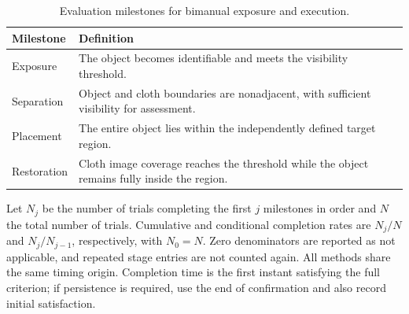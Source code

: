 \begin{table}[!tb]
\caption{Evaluation milestones for bimanual exposure and execution.}
\label{tab:everydaymilestones}
\centering\small
\begin{tabular}{p{}p{}}
\toprule
Milestone & Definition\\
\midrule
Exposure & The object becomes identifiable and meets the visibility threshold.\\
Separation & Object and cloth boundaries are nonadjacent, with sufficient visibility for assessment.\\
Placement & The entire object lies within the independently defined target region.\\
Restoration & Cloth image coverage reaches the threshold while the object remains fully inside the region.\\
\bottomrule
\end{tabular}
\end{table}
Let $N_j$ be the number of trials completing the first $j$ milestones in order and $N$ the total number of trials.
Cumulative and conditional completion rates are $N_j/N$ and $N_j/N_{j-1}$, respectively, with $N_0=N$.
Zero denominators are reported as not applicable, and repeated stage entries are not counted again.
All methods share the same timing origin.
Completion time is the first instant satisfying the full criterion; if persistence is required, use the end of confirmation and also record initial satisfaction.

